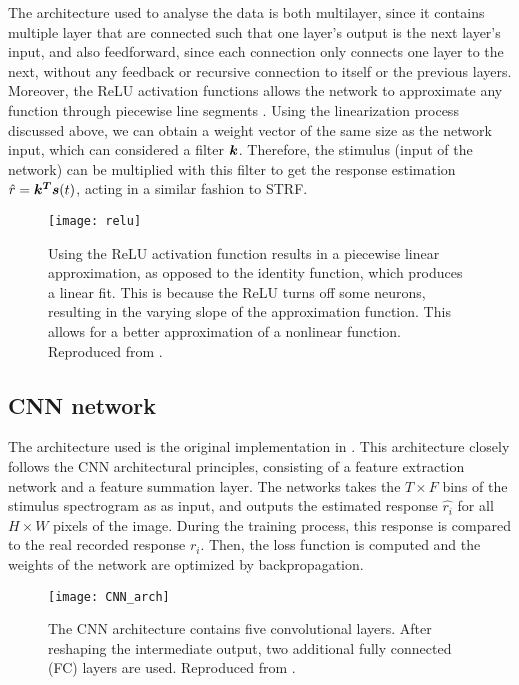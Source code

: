 The architecture used to analyse the data is both multilayer, since it contains multiple layer that are connected such that one layer's output is the next layer's input, and also feedforward, since each connection only connects one layer to the next, without any feedback or recursive connection to itself or the previous layers. Moreover, the ReLU activation functions allows the network to approximate any function through piecewise line segments \parencite{keshishianEstimatingInterpretingNonlinear2020}. Using the linearization process discussed above, we can obtain a weight vector of the same size as the network input, which can considered a filter $\bm{k}$. Therefore, the stimulus (input of the network) can be multiplied with this filter to get the response estimation $\hat{r} = \bm{k^T}\bm{s}(t)$, acting in a similar fashion to STRF.

\begin{figure}[ht]
	\centering
	\texttt{[image: relu]}
	\caption{Using the ReLU activation function results in a piecewise linear approximation, as opposed to the identity function, which produces a linear fit. This is because the ReLU turns off some neurons, resulting in the varying slope of the approximation function. This allows for a better approximation of a nonlinear function. Reproduced from \textcite{keshishianEstimatingInterpretingNonlinear2020}.}
	\label{fig:piecewise}
\end{figure}

\subsection{CNN network}
The architecture used is the original implementation in \textcite{keshishianEstimatingInterpretingNonlinear2020}. This architecture closely follows the CNN architectural principles, consisting of a feature extraction network and a feature summation layer. The networks takes the $T \times F$ bins of the stimulus spectrogram as as input, and outputs the estimated response $\hat{r_i}$ for all $H \times W$ pixels of the image. During the training process, this response is compared to the real recorded response $r_i$. Then, the loss function is computed and the weights of the network are optimized by backpropagation.

\begin{figure}[ht]
	\centering
	\texttt{[image: CNN\_arch]}
	\caption{The CNN architecture contains five convolutional layers. After reshaping the intermediate output, two additional fully connected (FC) layers are used. Reproduced from \textcite{keshishianEstimatingInterpretingNonlinear2020}.}
\end{figure}

